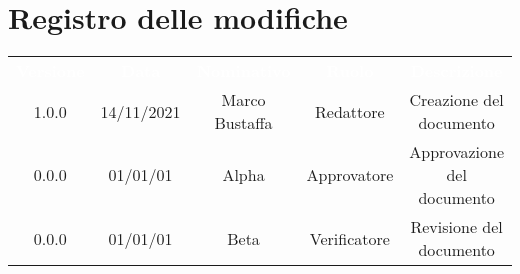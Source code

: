 \section*{Registro delle modifiche}

{\renewcommand{\arraystretch}{1.5}
\begin{tabular}{ccccc}
	\rowcolor[RGB]{33, 73, 50}
	\textcolor{white}{\textbf{Versione}} & \textcolor{white}{\textbf{Data}} & \textcolor{white}
	{\textbf{Nominativo}} & \textcolor{white}{\textbf{Ruolo}} & \textcolor{white}
	{\textbf{Descrizione}}\\
	\rowcolor[RGB]{216, 235, 171}
	1.0.0 & 14/11/2021 & Marco Bustaffa & Redattore & Creazione del documento\\
	\rowcolor[RGB]{233, 245, 206}
	0.0.0 & 01/01/01 & Alpha & Approvatore & Approvazione del documento\\
	\rowcolor[RGB]{216, 235, 171}
	0.0.0 & 01/01/01 & Beta & Verificatore & Revisione del documento\\
	
\end{tabular}	
}